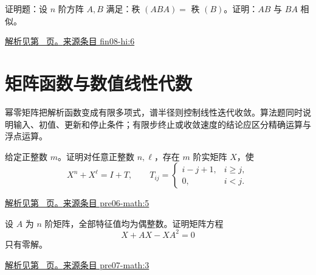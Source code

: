 \documentclass[12pt,fontset=fandol]{ctexart}
\begin{document}
\begin{example}\label{ex:fin08-hi:6}

证明题：设 $n$ 阶方阵 $A,B$ 满足：秩 $\left(ABA\right)=$ 秩 $\left(B\right)$。证明：$AB$ 与 $BA$ 相似。

\par\hyperref[ans:fin08-hi:6]{解析见第~\pageref{ans:fin08-hi:6} 页。}\quad\href{https://github.com/lzxcr/cmc-mathematics/blob/64916fa1fdbc3e444a652eca204d5669058ee321/src/problems/finals/08/06.md}{来源条目 fin08-hi:6}

\end{example}

\section{矩阵函数与数值线性代数}

\label{sec:questions-10}

幂零矩阵把解析函数变成有限多项式，谱半径则控制线性迭代收敛。算法题同时说明输入、初值、更新和停止条件；有限步终止或收敛速度的结论应区分精确运算与浮点运算。

\begin{example}\label{ex:pre06-math:5}

给定正整数 $m$。证明对任意正整数 $n,\ell$，存在 $m$ 阶实矩阵 $X$，使
\[
X^n+X^\ell=I+T,\qquad
T_{ij}=\begin{cases}i-j+1,&i\ge j,\\0,&i<j.\end{cases}
\]

\par\hyperref[ans:pre06-math:5]{解析见第~\pageref{ans:pre06-math:5} 页。}\quad\href{https://github.com/lzxcr/cmc-mathematics/blob/64916fa1fdbc3e444a652eca204d5669058ee321/src/problems/preliminary/06/05.md}{来源条目 pre06-math:5}

\end{example}

\begin{example}\label{ex:pre07-math:3}

设 $A$ 为 $n$ 阶矩阵，全部特征值均为偶整数。证明矩阵方程
\[
X+AX-XA^2=0
\]
只有零解。

\par\hyperref[ans:pre07-math:3]{解析见第~\pageref{ans:pre07-math:3} 页。}\quad\href{https://github.com/lzxcr/cmc-mathematics/blob/64916fa1fdbc3e444a652eca204d5669058ee321/src/problems/preliminary/07/03.md}{来源条目 pre07-math:3}

\end{example}
\end{document}
